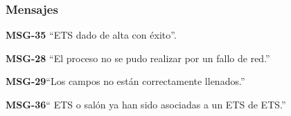 \subsubsection{Mensajes}

\begin{Citemize}
    \item {\bf MSG-35} ``ETS  dado de alta con éxito''.
    \item {\bf MSG-28}  ``El proceso no se pudo realizar por un fallo de red.''
    \item {\bf MSG-29}{``Los campos no están correctamente llenados.''}
    \item {\bf MSG-36}{`` ETS o salón  ya han sido asociadas a un ETS de ETS.''}
    
\end{Citemize}


